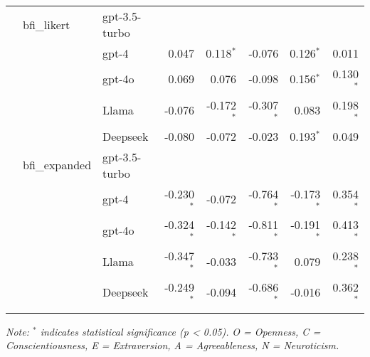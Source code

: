 \documentclass{article}
\begin{document}
\begin{longtable}{lllrrrrr}
\addlinespace
& bfi\_likert       & gpt-3.5-turbo &  &  &  &  &  \\
      &                   & gpt-4        & 0.047 & 0.118$^{*}$ & -0.076 & 0.126$^{*}$ & 0.011 \\
      &                   & gpt-4o       & 0.069 & 0.076 & -0.098 & 0.156$^{*}$ & 0.130$^{*}$ \\
      &                   & Llama        & -0.076 & -0.172$^{*}$ & -0.307$^{*}$ & 0.083 & 0.198$^{*}$ \\
      &                   & Deepseek     & -0.080 & -0.072 & -0.023 & 0.193$^{*}$ & 0.049 \\
\addlinespace
& bfi\_expanded     & gpt-3.5-turbo &  &  &  &  &  \\
      &                   & gpt-4        & -0.230$^{*}$ & -0.072 & -0.764$^{*}$ & -0.173$^{*}$ & 0.354$^{*}$ \\
      &                   & gpt-4o       & -0.324$^{*}$ & -0.142$^{*}$ & -0.811$^{*}$ & -0.191$^{*}$ & 0.413$^{*}$ \\
      &                   & Llama        & -0.347$^{*}$ & -0.033 & -0.733$^{*}$ & 0.079 & 0.238$^{*}$ \\
      &                   & Deepseek     & -0.249$^{*}$ & -0.094 & -0.686$^{*}$ & -0.016 & 0.362$^{*}$ \\
\addlinespace
\end{longtable}

\textit{Note: $^{*}$ indicates statistical significance (p < 0.05).}
\textit{O = Openness, C = Conscientiousness, E = Extraversion, A = Agreeableness, N = Neuroticism.}
\end{document}
